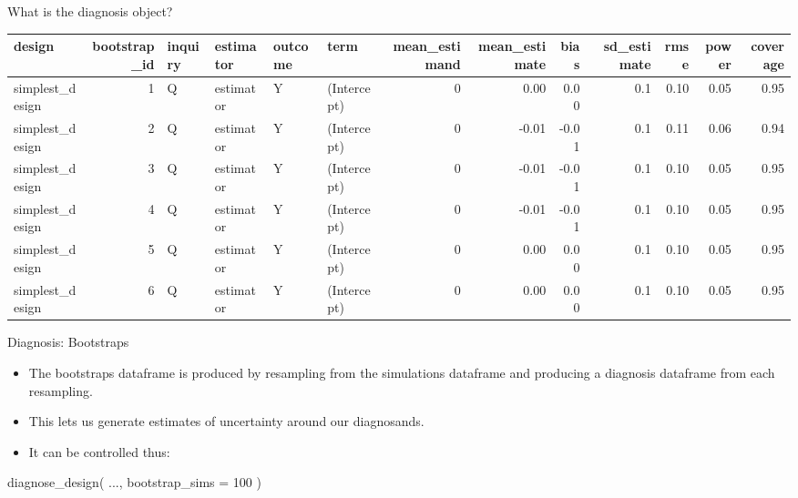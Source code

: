 \documentclass[
  11pt,
  ignorenonframetext,
]{beamer}
\newenvironment{Shaded}{\begin{snugshade}}{\end{snugshade}}
\newcommand{\AttributeTok}[1]{\textcolor[rgb]{0.40,0.45,0.13}{#1}}
\newcommand{\DecValTok}[1]{\textcolor[rgb]{0.68,0.00,0.00}{#1}}
\newcommand{\FunctionTok}[1]{\textcolor[rgb]{0.28,0.35,0.67}{#1}}
\newcommand{\NormalTok}[1]{\textcolor[rgb]{0.00,0.23,0.31}{#1}}
\newcommand{\SpecialCharTok}[1]{\textcolor[rgb]{0.37,0.37,0.37}{#1}}
\begin{document}
\begin{frame}[fragile]{What is the diagnosis object?}
\protect\hypertarget{what-is-the-diagnosis-object-3}{}
\begin{Shaded}
\end{Shaded}

\begin{tabular}{l|r|l|l|l|l|r|r|r|r|r|r|r}
\hline
design & bootstrap\_id & inquiry & estimator & outcome & term & mean\_estimand & mean\_estimate & bias & sd\_estimate & rmse & power & coverage\\
\hline
simplest\_design & 1 & Q & estimator & Y & (Intercept) & 0 & 0.00 & 0.00 & 0.1 & 0.10 & 0.05 & 0.95\\
\hline
simplest\_design & 2 & Q & estimator & Y & (Intercept) & 0 & -0.01 & -0.01 & 0.1 & 0.11 & 0.06 & 0.94\\
\hline
simplest\_design & 3 & Q & estimator & Y & (Intercept) & 0 & -0.01 & -0.01 & 0.1 & 0.10 & 0.05 & 0.95\\
\hline
simplest\_design & 4 & Q & estimator & Y & (Intercept) & 0 & -0.01 & -0.01 & 0.1 & 0.10 & 0.05 & 0.95\\
\hline
simplest\_design & 5 & Q & estimator & Y & (Intercept) & 0 & 0.00 & 0.00 & 0.1 & 0.10 & 0.05 & 0.95\\
\hline
simplest\_design & 6 & Q & estimator & Y & (Intercept) & 0 & 0.00 & 0.00 & 0.1 & 0.10 & 0.05 & 0.95\\
\hline
\end{tabular}
\end{frame}

\begin{frame}[fragile]{Diagnosis: Bootstraps}
\protect\hypertarget{diagnosis-bootstraps}{}
\begin{itemize}
\item
  The bootstraps dataframe is produced by resampling from the
  simulations dataframe and producing a diagnosis dataframe from each
  resampling.
\item
  This lets us generate estimates of uncertainty around our diagnosands.
\item
  It can be controlled thus:
\end{itemize}

\begin{Shaded}
\begin{Highlighting}[]
\FunctionTok{diagnose\_design}\NormalTok{(}
\NormalTok{  ...,}
  \AttributeTok{bootstrap\_sims =} \DecValTok{100}
\NormalTok{)}
\end{Highlighting}
\end{Shaded}
\end{frame}
\end{document}
